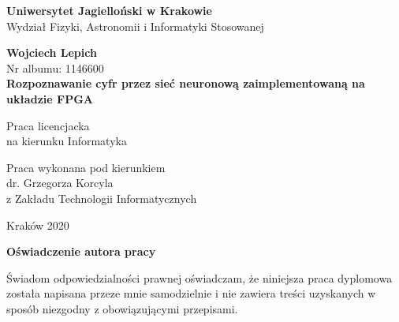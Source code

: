 \documentclass[12pt, oneside, a4paper]{article}
\begin{document}
\thispagestyle{empty}
\begin{titlepage}
    \begin{center}

      \Large
	    \textbf{Uniwersytet Jagielloński w Krakowie}\vspace{0.2cm}\\ Wydział Fizyki, Astronomii i Informatyki Stosowanej
      \vspace*{1cm}
               
      \vspace{3cm}
      \Large
      \textbf{Wojciech Lepich}\\\vspace{0.5cm}
      \normalsize Nr albumu: 1146600\\
      \vspace{2cm}
      \Huge
      \textbf{Rozpoznawanie cyfr przez sieć neuronową zaimplementowaną na układzie FPGA}
      
      \vspace{1.5cm}
      \normalsize
      Praca licencjacka\\
      na kierunku Informatyka\\ \vspace{0.15cm}
        
      \vfill
      \vspace{2cm}
      \begin{minipage}{1\textwidth}
\begin{flushright}
Praca wykonana pod kierunkiem\\
dr. Grzegorza Korcyla\\
z Zakładu Technologii Informatycznych
\end{flushright}
\end{minipage}
        
        \vspace{2cm}
        \begin{center}
      Kraków 2020
        \end{center}
    \end{center}
\end{titlepage}

\newpage 
\thispagestyle{empty}
\vspace{2.5cm}
\begin{flushleft}
\large \textbf{Oświadczenie autora pracy}\vspace{0.6cm}\\
\end{flushleft}

\noindent Świadom odpowiedzialności prawnej oświadczam, że niniejsza praca dyplomowa została napisana przeze mnie samodzielnie i nie zawiera treści uzyskanych w sposób niezgodny z obowiązującymi przepisami.\\
\end{document}
